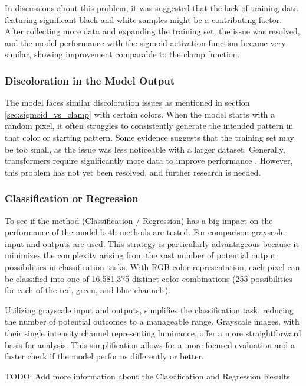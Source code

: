     In discussions about this problem, it was suggested that the lack of training data featuring significant black and white samples might be a contributing factor. After collecting more data and expanding the training set, the issue was resolved, and the model performance with the sigmoid activation function became very similar, showing improvement comparable to the clamp function.
    
    \subsubsection{Discoloration in the Model Output}
    
    The model faces similar discoloration issues as mentioned in section \autoref{sec:sigmoid_vs_clamp} with certain colors. When the model starts with a random pixel, it often struggles to consistently generate the intended pattern in that color or starting pattern. Some evidence suggests that the training set may be too small, as the issue was less noticeable with a larger dataset. Generally, transformers require significantly more data to improve performance \autocite{chen2022dearkd}. However, this problem has not yet been resolved, and further research is needed.

    \subsubsection{Classification or Regression}
    \label{sec:ClassificationOrRegression}

    To see if the method (Classification / Regression) has a big impact on the performance of the model both methods are tested. For comparison grayscale input and outputs are used. This strategy is particularly advantageous because it minimizes the complexity arising from the vast number of potential output possibilities in classification tasks. With RGB color representation, each pixel can be classified into one of 16,581,375 distinct color combinations (255 possibilities for each of the red, green, and blue channels).

    Utilizing grayscale input and outputs, simplifies the classification task, reducing the number of potential outcomes to a manageable range. Grayscale images, with their single intensity channel representing luminance, offer a more straightforward basis for analysis. This simplification allows for a more focused evaluation and a faster check if the model performs differently or better.

    TODO: Add more information about the Classification and Regression Results
        

